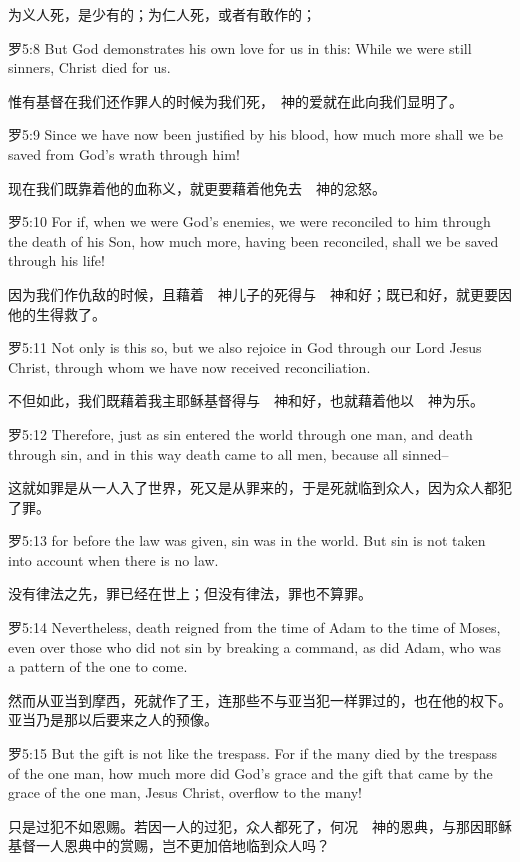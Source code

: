 \documentclass[a4paper,11pt,onecolumn,twoside]{ctexart}
\begin{document}
\begin{multicols}{2}
 为义人死，是少有的；为仁人死，或者有敢作的；


 罗5:8
 But God demonstrates his own love for us in this: While we were still sinners, Christ died for us.

 惟有基督在我们还作罪人的时候为我们死，　神的爱就在此向我们显明了。


 罗5:9
 Since we have now been justified by his blood, how much more shall we be saved from God's wrath through him!

 现在我们既靠着他的血称义，就更要藉着他免去　神的忿怒。


 罗5:10
 For if, when we were God's enemies, we were reconciled to him through the death of his Son, how much more, having been reconciled, shall we be saved through his life!

 因为我们作仇敌的时候，且藉着　神儿子的死得与　神和好；既已和好，就更要因他的生得救了。


 罗5:11
 Not only is this so, but we also rejoice in God through our Lord Jesus Christ, through whom we have now received reconciliation.

 不但如此，我们既藉着我主耶稣基督得与　神和好，也就藉着他以　神为乐。


 罗5:12
 Therefore, just as sin entered the world through one man, and death through sin, and in this way death came to all men, because all sinned--

 这就如罪是从一人入了世界，死又是从罪来的，于是死就临到众人，因为众人都犯了罪。


 罗5:13
 for before the law was given, sin was in the world. But sin is not taken into account when there is no law.

 没有律法之先，罪已经在世上；但没有律法，罪也不算罪。


 罗5:14
 Nevertheless, death reigned from the time of Adam to the time of Moses, even over those who did not sin by breaking a command, as did Adam, who was a pattern of the one to come.

 然而从亚当到摩西，死就作了王，连那些不与亚当犯一样罪过的，也在他的权下。亚当乃是那以后要来之人的预像。


 罗5:15
 But the gift is not like the trespass. For if the many died by the trespass of the one man, how much more did God's grace and the gift that came by the grace of the one man, Jesus Christ, overflow to the many!

 只是过犯不如恩赐。若因一人的过犯，众人都死了，何况　神的恩典，与那因耶稣基督一人恩典中的赏赐，岂不更加倍地临到众人吗？



\end{multicols}
\end{document}
